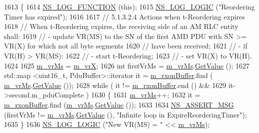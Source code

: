 \begin{DoxyCode}
1613 \{
1614   \hyperlink{log-macros-disabled_8h_a90b90d5bad1f39cb1b64923ea94c0761}{NS\_LOG\_FUNCTION} (\textcolor{keyword}{this});
1615   \hyperlink{group__logging_ga88acd260151caf2db9c0fc84997f45ce}{NS\_LOG\_LOGIC} (\textcolor{stringliteral}{"Reordering Timer has expired"});
1616 
1617   \textcolor{comment}{// 5.1.3.2.4 Actions when t-Reordering expires}
1618   \textcolor{comment}{// When t-Reordering expires, the receiving side of an AM RLC entity shall:}
1619   \textcolor{comment}{// - update VR(MS) to the SN of the first AMD PDU with SN >= VR(X) for which not all byte segments}
1620   \textcolor{comment}{//   have been received;}
1621   \textcolor{comment}{// - if VR(H) > VR(MS):}
1622   \textcolor{comment}{//    - start t-Reordering;}
1623   \textcolor{comment}{//    - set VR(X) to VR(H).}
1624 
1625   \hyperlink{classns3_1_1LteRlcAm_a474fc32f3d26bb6762782e8fd7e01c60}{m\_vrMs} = \hyperlink{classns3_1_1LteRlcAm_aafbeed1507367d3bcb51a3a5f7d3aa57}{m\_vrX};
1626   \textcolor{keywordtype}{int} firstVrMs = \hyperlink{classns3_1_1LteRlcAm_a474fc32f3d26bb6762782e8fd7e01c60}{m\_vrMs}.\hyperlink{classns3_1_1SequenceNumber10_a9dcaea04bc415e169e7e0020ce579d01}{GetValue} ();
1627   std::map <uint16\_t, PduBuffer>::iterator it = \hyperlink{classns3_1_1LteRlcAm_a7442b4f97fccd0c393dd9f27325a853a}{m\_rxonBuffer}.find (
      \hyperlink{classns3_1_1LteRlcAm_a474fc32f3d26bb6762782e8fd7e01c60}{m\_vrMs}.\hyperlink{classns3_1_1SequenceNumber10_a9dcaea04bc415e169e7e0020ce579d01}{GetValue} ());
1628   \textcolor{keywordflow}{while} ( it != \hyperlink{classns3_1_1LteRlcAm_a7442b4f97fccd0c393dd9f27325a853a}{m\_rxonBuffer}.end () &&
1629           it->second.m\_pduComplete )
1630     \{
1631       \hyperlink{classns3_1_1LteRlcAm_a474fc32f3d26bb6762782e8fd7e01c60}{m\_vrMs}++;
1632       it = \hyperlink{classns3_1_1LteRlcAm_a7442b4f97fccd0c393dd9f27325a853a}{m\_rxonBuffer}.find (\hyperlink{classns3_1_1LteRlcAm_a474fc32f3d26bb6762782e8fd7e01c60}{m\_vrMs}.\hyperlink{classns3_1_1SequenceNumber10_a9dcaea04bc415e169e7e0020ce579d01}{GetValue} ());
1633 
1634       \hyperlink{assert_8h_aff5ece9066c74e681e74999856f08539}{NS\_ASSERT\_MSG} (firstVrMs != \hyperlink{classns3_1_1LteRlcAm_a474fc32f3d26bb6762782e8fd7e01c60}{m\_vrMs}.\hyperlink{classns3_1_1SequenceNumber10_a9dcaea04bc415e169e7e0020ce579d01}{GetValue} (), \textcolor{stringliteral}{"Infinite loop in
       ExpireReorderingTimer"});
1635     \}
1636   \hyperlink{group__logging_ga88acd260151caf2db9c0fc84997f45ce}{NS\_LOG\_LOGIC} (\textcolor{stringliteral}{"New VR(MS) = "} << \hyperlink{classns3_1_1LteRlcAm_a474fc32f3d26bb6762782e8fd7e01c60}{m\_vrMs});

\end{DoxyCode}
